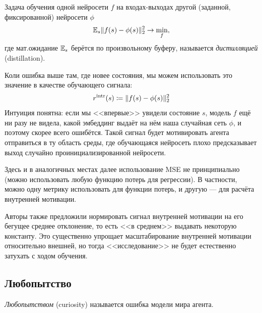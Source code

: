 \begin{definition}
Задача обучения одной нейросети $f$ на входах-выходах другой (заданной, фиксированной) нейросети $\phi$
$$\mathbb{E}_s \|f(s) - \phi(s)\|_2^2 \to \min_{f},$$
где мат.ожидание $\mathbb{E}_s$ берётся по произвольному буферу, называется \emph{дистилляцией} (distillation).
\end{definition}

Коли ошибка выше там, где новее состояния, мы можем использовать это значение в качестве обучающего сигнала:
$$r^{\mathrm{intr}}(s) \coloneqq \|f(s) - \phi(s)\|_2^2$$
Интуиция понятна: если мы <<впервые>> увидели состояние $s$, модель $f$ ещё ни разу не видела, какой эмбеддинг выдаёт на нём наша случайная сеть $\phi$, и поэтому скорее всего ошибётся. Такой сигнал будет мотивировать агента отправиться в ту область среды, где обучающаяся нейросеть плохо предсказывает выход случайно проинициализированной нейросети.

\begin{remark}
Здесь и в аналогичных местах далее использование MSE не принципиально (можно использовать любую функцию потерь для регрессии). В частности, можно одну метрику использовать для функции потерь, и другую --- для расчёта внутренней мотивации.
\end{remark}


\begin{remark}
Авторы также предложили нормировать сигнал внутренней мотивации на его бегущее среднее отклонение, то есть <<в среднем>> выдавать некоторую константу. Это существенно упрощает масштабирование внутренней мотивации относительно внешней, но тогда <<исследование>> не будет естественно затухать с ходом обучения.
\end{remark}

\subsection{Любопытство}

\begin{definition}
\emph{Любопытством} (curiosity) называется ошибка модели мира агента.
\end{definition}

